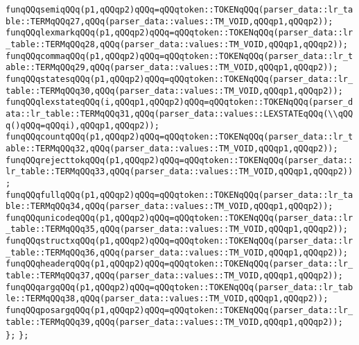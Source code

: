 \verb|funqQQqsemiqQQq(p1,qQQqp2)qQQq=qQQqtoken::TOKENqQQq(parser_data::lr_table::TERMqQQq27,qQQq(parser_data::values::TM_VOID,qQQqp1,qQQqp2));|\newline
\verb|funqQQqlexmarkqQQq(p1,qQQqp2)qQQq=qQQqtoken::TOKENqQQq(parser_data::lr_table::TERMqQQq28,qQQq(parser_data::values::TM_VOID,qQQqp1,qQQqp2));|\newline
\verb|funqQQqcommaqQQq(p1,qQQqp2)qQQq=qQQqtoken::TOKENqQQq(parser_data::lr_table::TERMqQQq29,qQQq(parser_data::values::TM_VOID,qQQqp1,qQQqp2));|\newline
\verb|funqQQqstatesqQQq(p1,qQQqp2)qQQq=qQQqtoken::TOKENqQQq(parser_data::lr_table::TERMqQQq30,qQQq(parser_data::values::TM_VOID,qQQqp1,qQQqp2));|\newline
\verb|funqQQqlexstateqQQq(i,qQQqp1,qQQqp2)qQQq=qQQqtoken::TOKENqQQq(parser_data::lr_table::TERMqQQq31,qQQq(parser_data::values::LEXSTATEqQQq(\\qQQq()qQQq=qQQqi),qQQqp1,qQQqp2));|\newline
\verb|funqQQqcountqQQq(p1,qQQqp2)qQQq=qQQqtoken::TOKENqQQq(parser_data::lr_table::TERMqQQq32,qQQq(parser_data::values::TM_VOID,qQQqp1,qQQqp2));|\newline
\verb|funqQQqrejecttokqQQq(p1,qQQqp2)qQQq=qQQqtoken::TOKENqQQq(parser_data::lr_table::TERMqQQq33,qQQq(parser_data::values::TM_VOID,qQQqp1,qQQqp2));|\newline
\verb|funqQQqfullqQQq(p1,qQQqp2)qQQq=qQQqtoken::TOKENqQQq(parser_data::lr_table::TERMqQQq34,qQQq(parser_data::values::TM_VOID,qQQqp1,qQQqp2));|\newline
\verb|funqQQqunicodeqQQq(p1,qQQqp2)qQQq=qQQqtoken::TOKENqQQq(parser_data::lr_table::TERMqQQq35,qQQq(parser_data::values::TM_VOID,qQQqp1,qQQqp2));|\newline
\verb|funqQQqstructxqQQq(p1,qQQqp2)qQQq=qQQqtoken::TOKENqQQq(parser_data::lr_table::TERMqQQq36,qQQq(parser_data::values::TM_VOID,qQQqp1,qQQqp2));|\newline
\verb|funqQQqheaderqQQq(p1,qQQqp2)qQQq=qQQqtoken::TOKENqQQq(parser_data::lr_table::TERMqQQq37,qQQq(parser_data::values::TM_VOID,qQQqp1,qQQqp2));|\newline
\verb|funqQQqargqQQq(p1,qQQqp2)qQQq=qQQqtoken::TOKENqQQq(parser_data::lr_table::TERMqQQq38,qQQq(parser_data::values::TM_VOID,qQQqp1,qQQqp2));|\newline
\verb|funqQQqposargqQQq(p1,qQQqp2)qQQq=qQQqtoken::TOKENqQQq(parser_data::lr_table::TERMqQQq39,qQQq(parser_data::values::TM_VOID,qQQqp1,qQQqp2));|\newline
\verb|};|\newline
\verb|};|\newline

